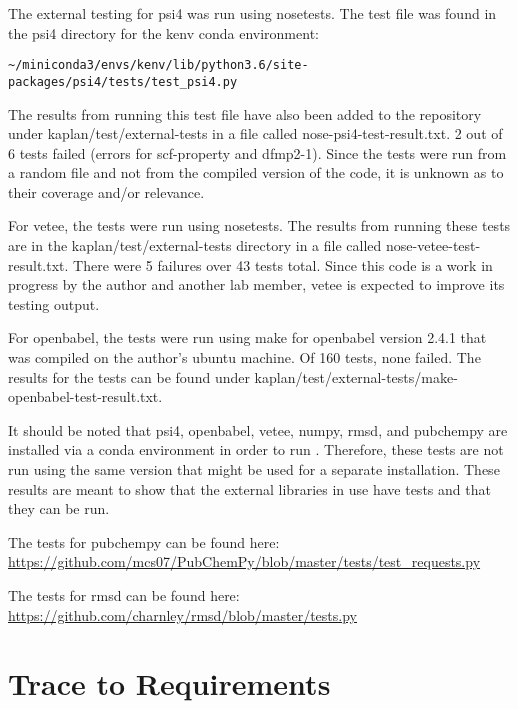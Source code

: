 \documentclass[12pt, titlepage]{article}
\begin{document}
The external testing for psi4 was run using nosetests. The test file was found 
in the psi4 directory for the kenv conda environment:

\begin{adjustwidth}{-0.5in}{-0.5in}
\begin{center}
\begin{lstlisting}
~/miniconda3/envs/kenv/lib/python3.6/site-packages/psi4/tests/test_psi4.py
\end{lstlisting}
\end{center}
\end{adjustwidth}

The results from running this test file have also been added to the \progname{} 
repository under kaplan/test/external-tests in a file called 
nose-psi4-test-result.txt. 2 out of 6 tests failed (errors for scf-property and 
dfmp2-1). Since the tests were run from a random file and not from the compiled 
version of the code, it is unknown as to their coverage and/or relevance.

For vetee, the tests were run using nosetests. The results from running these 
tests are in the kaplan/test/external-tests directory in a file called 
nose-vetee-test-result.txt. There were 5 failures over 43 tests total. Since 
this code is a work in progress by the author and another lab member, vetee is 
expected to improve its testing output.

For openbabel, the tests were run using make for openbabel version 2.4.1 that 
was compiled on the author's ubuntu machine. Of 160 tests, none failed. The 
results for the tests can be found under 
kaplan/test/external-tests/make-openbabel-test-result.txt.

It should be noted that psi4, openbabel, vetee, numpy, rmsd, and pubchempy are 
installed via a conda environment in order to run \progname{}. Therefore, these 
tests are not run using the same version that might be used for a separate 
installation. These results are meant to show that the external libraries in 
use have tests and that they can be run.

The tests for pubchempy can be found here: 
\url{https://github.com/mcs07/PubChemPy/blob/master/tests/test_requests.py}

The tests for rmsd can be found here:
\url{https://github.com/charnley/rmsd/blob/master/tests.py}
		
\section{Trace to Requirements}
\end{document}
